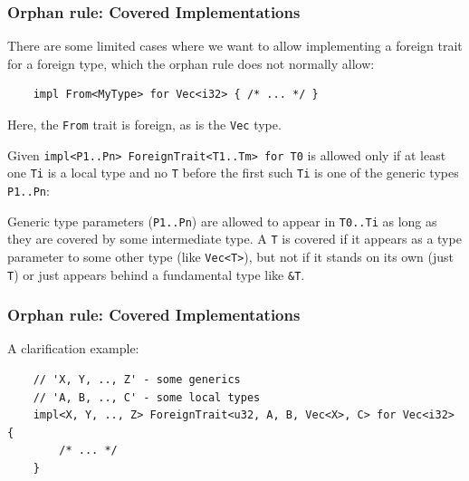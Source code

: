 \documentclass[aspectratio=1610,t]{beamer}
\begin{document}

\begin{frame}[fragile]
\frametitle{Orphan rule: Covered Implementations}
There are some limited cases where we want to allow implementing a foreign trait for a foreign type, which the orphan rule does not normally allow:

\begin{verbatim}
    impl From<MyType> for Vec<i32> { /* ... */ }
\end{verbatim}

Here, the \texttt{From} trait is foreign, as is the \texttt{Vec} type.

Given \texttt{impl<P1..Pn> ForeignTrait<T1..Tm> for T0} is allowed only if at least one \texttt{Ti} is a local type and no \texttt{T} before the first such \texttt{Ti} is one of the generic types \texttt{P1..Pn}:

Generic type parameters (\texttt{P1..Pn}) are allowed to appear in \texttt{T0..Ti} as long as they are covered by some intermediate type. A \texttt{T} is covered if it appears as a type parameter to some other type (like \texttt{Vec<T>}), but not if it stands on its own (just \texttt{T}) or just appears behind a fundamental type like \texttt{\&T}.
\end{frame}


\begin{frame}[fragile]
\frametitle{Orphan rule: Covered Implementations}
A clarification example:

\begin{verbatim}
    // 'X, Y, .., Z' - some generics
    // 'A, B, .., C' - some local types
    impl<X, Y, .., Z> ForeignTrait<u32, A, B, Vec<X>, C> for Vec<i32> {
        /* ... */
    }
\end{verbatim}
\end{frame}


\end{document}

